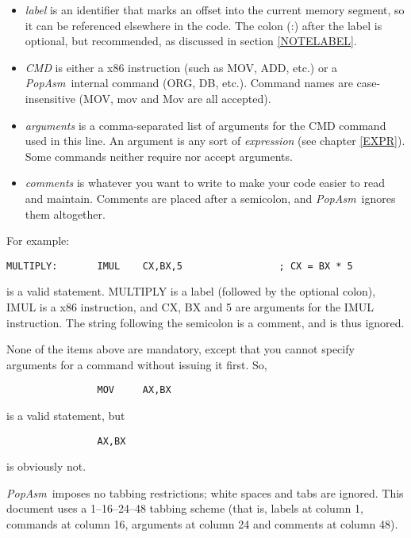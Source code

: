 \documentclass[a4paper,12pt]{book}
\newcommand{\popasm}{\emph{PopAsm}}
\begin{document}
\begin{itemize}
\item{\emph{label}} is an identifier that marks an offset into the current
   memory segment, so it can be referenced elsewhere in the code. The colon
   (:) after the label is optional, but recommended, as discussed in section
   \ref{NOTELABEL}.
\item{\emph{CMD}} is either a x86 instruction (such as MOV, ADD, etc.) or a
   \popasm\ internal command (ORG, DB, etc.). Command names are
   case-insensitive (MOV, mov and Mov are all accepted).
\item{\emph{arguments}} is a comma-separated list of arguments for the CMD
   command used in this line. An argument is any sort of \emph{expression}
   (see chapter \ref{EXPR}). Some commands neither require nor accept arguments.
\item{\emph{comments}} is whatever you want to write to make your code easier
   to read and maintain. Comments are placed after a semicolon, and
   \popasm\ ignores them altogether.
\end{itemize}

For example:

\begin{verbatim}
MULTIPLY:       IMUL    CX,BX,5                 ; CX = BX * 5
\end{verbatim}

\noindent is a valid statement. MULTIPLY is a label (followed by the
optional colon), IMUL is a x86 instruction, and CX, BX and 5 are
arguments for the IMUL instruction. The string following the semicolon
is a comment, and is thus ignored.

None of the items above are mandatory, except that you cannot specify
arguments for a command without issuing it first. So,

\begin{verbatim}
                MOV     AX,BX
\end{verbatim}

\noindent is a valid statement, but

\begin{verbatim}
                AX,BX
\end{verbatim}

\noindent is obviously not.

\popasm\ imposes no tabbing restrictions; white spaces and tabs are
ignored. This document uses a 1--16--24--48 tabbing scheme (that is,
labels at column 1, commands at column 16, arguments at column 24 and
comments at column 48).
\end{document}
